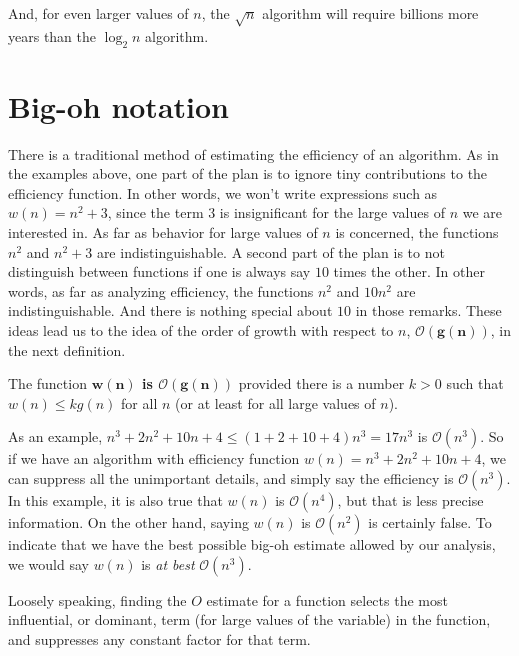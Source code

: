 And, for even larger values of $n$, the $\sqrt{n}$ algorithm will require
billions more years than the $\log_2{n}$ algorithm.

\section{Big-oh notation}
There is a traditional method of estimating the efficiency of an algorithm.
As in the examples above, one part of the plan is to ignore tiny contributions
to the efficiency function. In other words, we won't write expressions 
such as $w(n) = n^2 + 3$, since the term $3$ is insignificant for the large
values of $n$ we are interested in. As far as behavior for large values of $n$
is concerned, the functions $n^2$ and $n^2+3$ are indistinguishable.
A second part of the plan is to not distinguish between functions
if one is always  say $10$ times the other. In other words, as far
as analyzing efficiency, the functions $n^2$ and $10n^2$ are 
indistinguishable. And there is nothing special about $10$ in those
remarks. These ideas lead us to the idea of the order of growth with respect to $n$,
$\mathbf{\mathcal{O}(g(n))}$, in the next definition.


\begin{defn}
The function {\bfseries $\mathbf{w(n)}$ is $\mathbf{\mathcal{O}(g(n))}$}%
%
provided there is a number $k>0$ such that $w(n)\leq kg(n)$ for
all $n$ (or at least for all large values of $n$).

\end{defn}

As an example,  $n^3+2n^2 + 10n+4\leq(1+2+10+4)n^3 = 17n^3$ is
$\mathcal{O}(n^3)$.  So if we have an algorithm with efficiency function
$w(n) = n^3+2n^2 + 10n+4$, we can suppress all the unimportant
details, and simply say the efficiency is $\mathcal{O}(n^3)$.
In this example, it is also true that $w(n)$ is $\mathcal{O}(n^4)$, but that
is less precise information. On the other hand, saying
$w(n)$ is $\mathcal{O}(n^2)$ is certainly false. To indicate that we have the
best possible big-oh estimate allowed by our analysis, we would say
$w(n)$ is {\it at best} $\mathcal{O}(n^3)$.

Loosely speaking, finding the $O$ estimate for a function selects the
most influential, or dominant, term (for large values of the variable) in the function, 
and suppresses any constant factor for that term.

